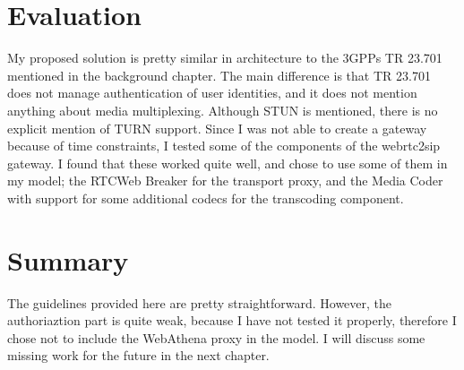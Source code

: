 \section{Evaluation}
My proposed solution is pretty similar in architecture to the 3GPPs TR 23.701 mentioned in the background chapter. The main difference is that TR 23.701 does not manage authentication of user identities, and it does not mention anything about media multiplexing. Although STUN is mentioned, there is no explicit mention of TURN support. Since I was not able to create a gateway because of time constraints, I tested some of the components of the webrtc2sip gateway. I found that these worked quite well, and chose to use some of them in my model; the RTCWeb Breaker for the transport proxy, and the Media Coder with support for some additional codecs for the transcoding component.

\section{Summary}
The guidelines provided here are pretty straightforward. However, the authoriaztion part is quite weak, because I have not tested it properly, therefore I chose not to include the WebAthena proxy in the model. I will discuss some missing work for the future in the next chapter. 